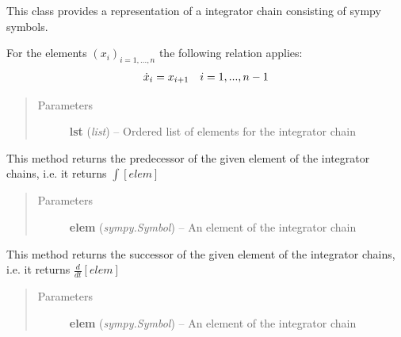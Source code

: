 \documentclass[letterpaper,10pt,english]{sphinxmanual}
\begin{document}
\begin{fulllineitems}
\label{pytrajectory:pytrajectory.utilities.IntegChain}
This class provides a representation of a integrator chain consisting of sympy symbols.

For the elements \((x_i)_{i=1,...,n}\) the following relation applies:
\begin{gather}
\begin{split}\dot{x}_i = x_{i+1} \quad i = 1,...,n-1\end{split}\notag
\end{gather}\begin{quote}\begin{description}
\item[{Parameters}] \leavevmode
\textbf{lst} (\emph{list}) -- Ordered list of elements for the integrator chain

\end{description}\end{quote}

\begin{fulllineitems}
\label{pytrajectory:pytrajectory.utilities.IntegChain.pred}
This method returns the predecessor of the given element of the
integrator chains, i.e. it returns \(\int [elem]\)
\begin{quote}\begin{description}
\item[{Parameters}] \leavevmode
\textbf{elem} (\emph{sympy.Symbol}) -- An element of the integrator chain

\end{description}\end{quote}

\end{fulllineitems}


\begin{fulllineitems}
\label{pytrajectory:pytrajectory.utilities.IntegChain.succ}
This method returns the successor of the given element of the
integrator chains, i.e. it returns \(\frac{d}{dt}[elem]\)
\begin{quote}\begin{description}
\item[{Parameters}] \leavevmode
\textbf{elem} (\emph{sympy.Symbol}) -- An element of the integrator chain

\end{description}\end{quote}

\end{fulllineitems}


\end{fulllineitems}
\end{document}
